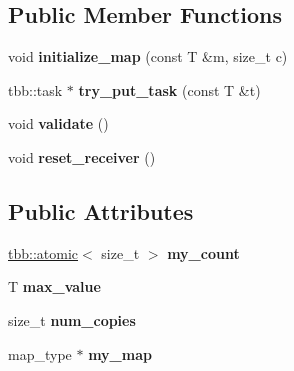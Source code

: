\subsection*{Public Member Functions}
\begin{DoxyCompactItemize}
\item 
\hypertarget{structharness__mapped__receiver_a2a9cf0be0b8460ab0c170caab114408d}{}void {\bfseries initialize\+\_\+map} (const T \&m, size\+\_\+t c)\label{structharness__mapped__receiver_a2a9cf0be0b8460ab0c170caab114408d}

\item 
\hypertarget{structharness__mapped__receiver_a38220dd5ec06644199cc5e37bd70296f}{}tbb\+::task $\ast$ {\bfseries try\+\_\+put\+\_\+task} (const T \&t)\label{structharness__mapped__receiver_a38220dd5ec06644199cc5e37bd70296f}

\item 
\hypertarget{structharness__mapped__receiver_ab968af1265fa735944c23ef33f937580}{}void {\bfseries validate} ()\label{structharness__mapped__receiver_ab968af1265fa735944c23ef33f937580}

\item 
\hypertarget{structharness__mapped__receiver_a9c7642aad9b9fd0af7ff4d8f608928d1}{}void {\bfseries reset\+\_\+receiver} ()\label{structharness__mapped__receiver_a9c7642aad9b9fd0af7ff4d8f608928d1}

\end{DoxyCompactItemize}
\subsection*{Public Attributes}
\begin{DoxyCompactItemize}
\item 
\hypertarget{structharness__mapped__receiver_a635b2b62fa469c6d3f0e985b49d2daab}{}\hyperlink{structtbb_1_1atomic}{tbb\+::atomic}$<$ size\+\_\+t $>$ {\bfseries my\+\_\+count}\label{structharness__mapped__receiver_a635b2b62fa469c6d3f0e985b49d2daab}

\item 
\hypertarget{structharness__mapped__receiver_a2b70063e4d0dbf671f7b2caa1406a305}{}T {\bfseries max\+\_\+value}\label{structharness__mapped__receiver_a2b70063e4d0dbf671f7b2caa1406a305}

\item 
\hypertarget{structharness__mapped__receiver_ac13c6ae19702298159c11df7041a9de0}{}size\+\_\+t {\bfseries num\+\_\+copies}\label{structharness__mapped__receiver_ac13c6ae19702298159c11df7041a9de0}

\item 
\hypertarget{structharness__mapped__receiver_a06317e3c8de4ff6b01f975c8f2573f0e}{}map\+\_\+type $\ast$ {\bfseries my\+\_\+map}\label{structharness__mapped__receiver_a06317e3c8de4ff6b01f975c8f2573f0e}

\end{DoxyCompactItemize}


